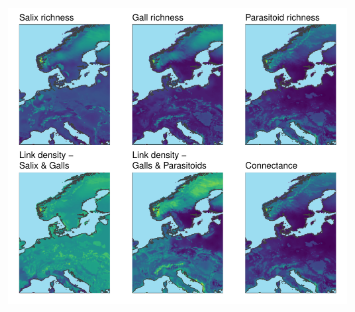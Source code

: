 \documentclass[12pt]{article}
\begin{document}
\begin{figure}[ht!]
\centering\includegraphics[width=0.8\textwidth]{figures/map_connectance}
\end{figure}

\newpage


\end{document}
